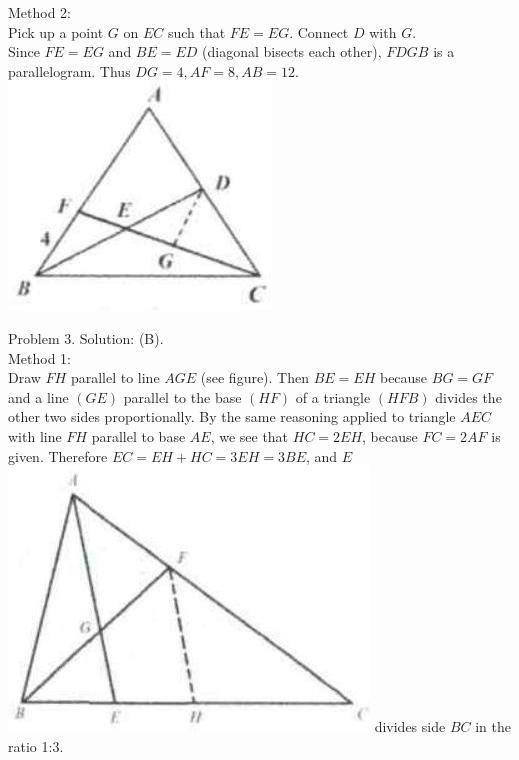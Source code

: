 \documentclass[10pt]{article}
\begin{document}
Method 2:\\
Pick up a point \(G\) on \(E C\) such that \(F E=E G\). Connect \(D\) with \(G\).\\
Since \(F E=E G\) and \(B E=E D\) (diagonal bisects each other), \(F D G B\) is a parallelogram. Thus \(D G=4, A F=8, A B=12\).\\
\includegraphics[max width=\textwidth, center]{2025_04_17_97bc1f7e44d93c271a88g-132(1)}

Problem 3. Solution: (B).\\
Method 1:\\
Draw \(F H\) parallel to line \(A G E\) (see figure). Then \(B E=E H\) because \(B G=G F\) and a line \((G E)\) parallel to the base \((H F)\) of a triangle \((H F B)\) divides the other two sides proportionally. By the same reasoning applied to triangle \(A E C\) with line \(F H\) parallel to base \(A E\), we see that \(H C=2 E H\), because \(F C=2 A F\) is given. Therefore \(E C=E H+H C=3 E H=3 B E\), and \(E\)\\
\includegraphics[max width=\textwidth]{2025_04_17_97bc1f7e44d93c271a88g-132} divides side \(B C\) in the ratio 1:3.
\end{document}
